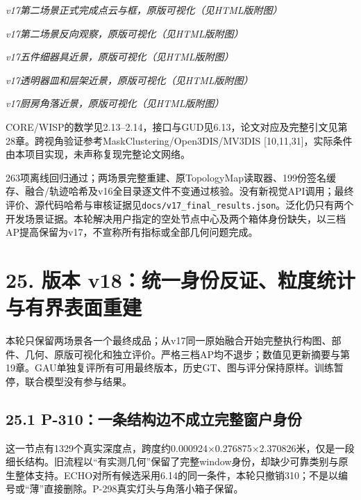 \documentclass[UTF8,fontset=fandol]{ctexart}
\begin{document}
\textit{v17第二场景正式完成点云与框，原版可视化（见HTML版附图）}



\textit{v17第二场景反向观察，原版可视化（见HTML版附图）}



\textit{v17五件细器具近景，原版可视化（见HTML版附图）}



\textit{v17透明器皿和层架近景，原版可视化（见HTML版附图）}



\textit{v17厨房角落近景，原版可视化（见HTML版附图）}



CORE/WISP的数学见2.13–2.14，接口与GUD见6.13，论文对应及完整引文见第28章。跨视角验证参考MaskClustering/Open3DIS/MV3DIS [10,11,31]，实际条件由本项目实现，未声称复现完整论文网络。



263项离线回归通过；两场景完整重建、原TopologyMap读取器、199份签名缓存、融合/轨迹哈希及v16全目录逐文件不变通过核验。没有新视觉API调用；最终评价、源代码哈希与审核证据见\texttt{docs/\allowbreak{}v17\_\allowbreak{}final\_\allowbreak{}results.\allowbreak{}json}。泛化仍只有两个开发场景证据。本轮解决用户指定的空处节点中心及两个箱体身份缺失，以三档AP提高保留为v17，不宣称所有指标或全部几何问题完成。



\section*{25. 版本 v18：统一身份反证、粒度统计与有界表面重建}

本轮只保留两场景各一个最终成品；从v17同一原始融合开始完整执行构图、部件、几何、原版可视化和独立评价。严格三档AP均不退步；数值见更新摘要与第19章。GAU单独复评所有可用最终版本，历史GT、图与评分保持原样。训练暂停，联合模型没有参与结果。



\subsection*{25.1 P-310：一条结构边不成立完整窗户身份}

这一节点有1329个真实深度点，跨度约0.000924×0.276875×2.370826米，仅是一段细长结构。旧流程以“有实测几何”保留了完整window身份，却缺少可靠类别与原生整体支持。ECHO对所有候选采用6.14的同一条件，本轮只撤销310；不是以编号或“薄”直接删除。P-298真实灯头与角落小箱子保留。
\end{document}
